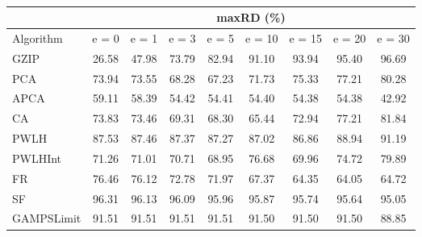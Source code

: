 \begin{table}[h]
\newcommand{\cpca}{\cellcolor{cyan!20}}
\newcommand{\capca}{\cellcolor{green!20}}
\newcommand{\cfr}{\cellcolor{yellow!25}}
\newcommand{\cgzip}{\cellcolor{orange!20}}
\newcommand{\best}{\cellcolor{gray!30}}
\centering\hspace*{0cm}\begin{tabular}{| l | c | c | c | c | c | c | c | c |}\cline{2-9}\multicolumn{1}{c|}{}& \multicolumn{8}{c|}{maxRD (\%)}\\\hline
{Algorithm} & {e = 0} & {e = 1} & {e = 3} & {e = 5} & {e = 10} & {e = 15} & {e = 20} & {e = 30} \\\hline
{GZIP\cgzip} & {\best26.58} & {\best47.98} & {73.79} & {82.94} & {91.10} & {93.94} & {95.40} & {96.69} \\\hline
{PCA\cpca} & {73.94} & {73.55} & {68.28} & {67.23} & {71.73} & {75.33} & {77.21} & {80.28} \\\hline
{APCA\capca} & {59.11} & {58.39} & {\best54.42} & {\best54.41} & {\best54.40} & {\best54.38} & {\best54.38} & {\best42.92} \\\hline
{CA} & {73.83} & {73.46} & {69.31} & {68.30} & {65.44} & {72.94} & {77.21} & {81.84} \\\hline
{PWLH} & {87.53} & {87.46} & {87.37} & {87.27} & {87.02} & {86.86} & {88.94} & {91.19} \\\hline
{PWLHInt} & {71.26} & {71.01} & {70.71} & {68.95} & {76.68} & {69.96} & {74.72} & {79.89} \\\hline
{FR\cfr} & {76.46} & {76.12} & {72.78} & {71.97} & {67.37} & {64.35} & {64.05} & {64.72} \\\hline
{SF} & {96.31} & {96.13} & {96.09} & {95.96} & {95.87} & {95.74} & {95.64} & {95.05} \\\hline
{GAMPSLimit} & {91.51} & {91.51} & {91.51} & {91.51} & {91.50} & {91.50} & {91.50} & {88.85} \\\hline
\end{tabular}
\caption{\captionminmaxtwo}
\label{experiments:minmaxtwo}
\end{table}

